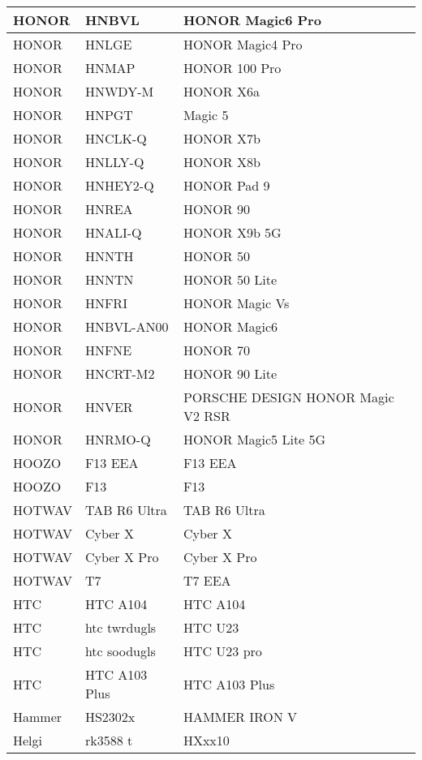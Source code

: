 \begin{tabularx}{\linewidth}{|l|X|X|}
        HONOR & HNBVL & HONOR Magic6 Pro \\ \hline
        HONOR & HNLGE & HONOR Magic4 Pro \\ \hline
        HONOR & HNMAP & HONOR 100 Pro \\ \hline
        HONOR & HNWDY-M & HONOR X6a \\ \hline
        HONOR & HNPGT & Magic 5 \\ \hline
        HONOR & HNCLK-Q & HONOR X7b \\ \hline
        HONOR & HNLLY-Q & HONOR X8b \\ \hline
        HONOR & HNHEY2-Q & HONOR Pad 9 \\ \hline
        HONOR & HNREA & HONOR 90 \\ \hline
        HONOR & HNALI-Q & HONOR X9b 5G \\ \hline
        HONOR & HNNTH & HONOR 50 \\ \hline
        HONOR & HNNTN & HONOR 50 Lite \\ \hline
        HONOR & HNFRI & HONOR Magic Vs \\ \hline
        HONOR & HNBVL-AN00 & HONOR Magic6 \\ \hline
        HONOR & HNFNE & HONOR 70 \\ \hline
        HONOR & HNCRT-M2 & HONOR 90 Lite \\ \hline
        HONOR & HNVER & PORSCHE DESIGN HONOR Magic V2 RSR \\ \hline
        HONOR & HNRMO-Q & HONOR Magic5 Lite 5G \\ \hline
        HOOZO & F13 EEA & F13 EEA \\ \hline
        HOOZO & F13 & F13 \\ \hline
        HOTWAV & TAB R6 Ultra & TAB R6 Ultra \\ \hline
        HOTWAV & Cyber X & Cyber X \\ \hline
        HOTWAV & Cyber X Pro & Cyber X Pro \\ \hline
        HOTWAV & T7 & T7 EEA \\ \hline
        HTC & HTC A104 & HTC A104 \\ \hline
        HTC & htc twrdugls & HTC U23 \\ \hline
        HTC & htc soodugls & HTC U23 pro \\ \hline
        HTC & HTC A103 Plus & HTC A103 Plus \\ \hline
        Hammer & HS2302x & HAMMER IRON V \\ \hline
        Helgi & rk3588 t & HXxx10 \\ \hline

\end{tabularx}
